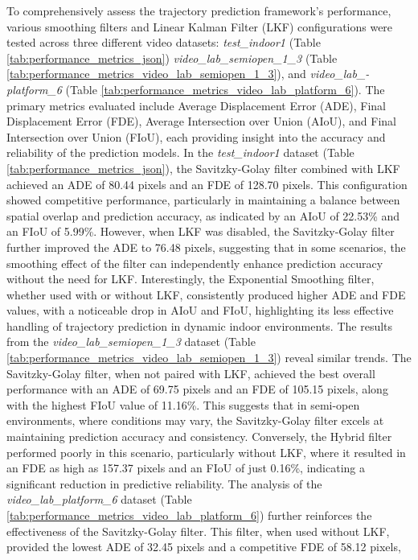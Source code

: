 \documentclass[12pt,oneside]{book} %
\begin{document}
To comprehensively assess the trajectory prediction framework's performance,
various smoothing filters and Linear Kalman Filter (LKF) configurations were
tested across three different video datasets: \textit{test\_indoor1} (Table
\ref{tab:performance_metrics_json}) \textit{video\_lab\_semiopen\_1\_3} (Table
\ref{tab:performance_metrics_video_lab_semiopen_1_3}), and
\textit{video\_lab\_-platform\_6} (Table
\ref{tab:performance_metrics_video_lab_platform_6}). The primary metrics
evaluated include Average Displacement Error (ADE), Final Displacement Error
(FDE), Average Intersection over Union (AIoU), and Final Intersection over
Union (FIoU), each providing insight into the accuracy and reliability of the
prediction models. In the \textit{test\_indoor1} dataset (Table
\ref{tab:performance_metrics_json}), the Savitzky-Golay filter combined with
LKF achieved an ADE of 80.44 pixels and an FDE of 128.70 pixels. This
configuration showed competitive performance, particularly in maintaining a
balance between spatial overlap and prediction accuracy, as indicated by an
AIoU of 22.53\% and an FIoU of 5.99\%. However, when LKF was disabled, the
Savitzky-Golay filter further improved the ADE to 76.48 pixels, suggesting that
in some scenarios, the smoothing effect of the filter can independently enhance
prediction accuracy without the need for LKF. Interestingly, the Exponential
Smoothing filter, whether used with or without LKF, consistently produced
higher ADE and FDE values, with a noticeable drop in AIoU and FIoU,
highlighting its less effective handling of trajectory prediction in dynamic
indoor environments. The results from the \textit{video\_lab\_semiopen\_1\_3}
dataset (Table \ref{tab:performance_metrics_video_lab_semiopen_1_3}) reveal
similar trends. The Savitzky-Golay filter, when not paired with LKF, achieved
the best overall performance with an ADE of 69.75 pixels and an FDE of 105.15
pixels, along with the highest FIoU value of 11.16\%. This suggests that in
semi-open environments, where conditions may vary, the Savitzky-Golay filter
excels at maintaining prediction accuracy and consistency. Conversely, the
Hybrid filter performed poorly in this scenario, particularly without LKF,
where it resulted in an FDE as high as 157.37 pixels and an FIoU of just
0.16\%, indicating a significant reduction in predictive reliability. The
analysis of the \textit{video\_lab\_platform\_6} dataset (Table
\ref{tab:performance_metrics_video_lab_platform_6}) further reinforces the
effectiveness of the Savitzky-Golay filter. This filter, when used without LKF,
provided the lowest ADE of 32.45 pixels and a competitive FDE of 58.12 pixels,
\end{document}
